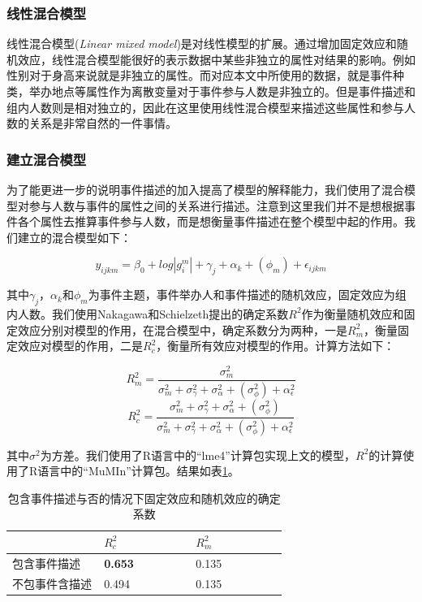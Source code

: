 \documentclass[12pt]{template}
\begin{document}
\subsubsection{线性混合模型}

线性混合模型(\textit{Linear mixed model})是对线性模型的扩展。通过增加固定效应和随机效应，线性混合模型能很好的表示数据中某些非独立的属性对结果的影响。例如性别对于身高来说就是非独立的属性。而对应本文中所使用的数据，就是事件种类，举办地点等属性作为离散变量对于事件参与人数是非独立的。但是事件描述和组内人数则是相对独立的，因此在这里使用线性混合模型来描述这些属性和参与人数的关系是非常自然的一件事情。

\subsubsection{建立混合模型}

为了能更进一步的说明事件描述的加入提高了模型的解释能力，我们使用了混合模型对参与人数与事件的属性之间的关系进行描述。注意到这里我们并不是想根据事件各个属性去推算事件参与人数，而是想衡量事件描述在整个模型中起的作用。我们建立的混合模型如下：

\begin{equation}
y_{ijkm}=\beta_0+log|g_i^m|+\gamma_j+\alpha_k+ (\phi_m) +\epsilon_{ijkm}
\end{equation}

其中\(\gamma_j\)，\(\alpha_k\)和\(\phi_m\)为事件主题，事件举办人和事件描述的随机效应，固定效应为组内人数。我们使用Nakagawa和Schielzeth\citep{nakagawa_ageneralandsimplemethodforobtaining_2013}提出的确定系数\(R^2\)作为衡量随机效应和固定效应分别对模型的作用，在混合模型中，确定系数分为两种，一是\(R_m^2\)，衡量固定效应对模型的作用，二是\(R_c^2\)，衡量所有效应对模型的作用。计算方法如下：

\begin{equation}
R_m^2=\frac{\sigma_m^2}{\sigma_m^2+\sigma_\gamma^2+\sigma_\alpha^2+(\sigma_\phi^2)+\alpha_\epsilon^2}
\end{equation}
\begin{equation}
R_c^2=\frac{\sigma_m^2+\sigma_\gamma^2+\sigma_\alpha^2+(\sigma_\phi^2)}{\sigma_m^2+\sigma_\gamma^2+\sigma_\alpha^2+(\sigma_\phi^2)+\alpha_\epsilon^2}
\end{equation}

其中\(\sigma^2\)为方差。我们使用了R语言中的``lme4''计算包\citep{lme4}实现上文的模型，\(R^2\)的计算使用了R语言中的``MuMIn''计算包\citep{MuMIn}。结果如表\ref{t1-4}。



\begin{table}[h]
  \caption{\label{t1-4}包含事件描述与否的情况下固定效应和随机效应的确定系数}
	\centering  
    \begin{tabular*}{\linewidth}{p{0.33\linewidth}p{0.33\linewidth}p{0.33\linewidth}}
  \toprule
    &  \(R_c^2\) & \(R_m^2\) \\ 
  \midrule
		包含事件描述                       & \textbf{0.653} & 0.135 \\ 
    不包事件含描述                        & 0.494 & 0.135 \\ 
  \bottomrule
    \end{tabular*}
\end{table}
\end{document}
